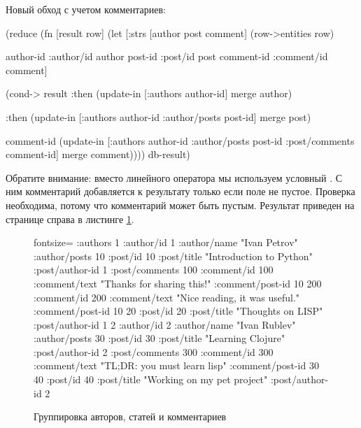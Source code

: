 Новый обход с учетом комментариев:

\begin{english}
  \begin{clojure}
(reduce
 (fn [result row]
   (let [{:strs [author post comment]}
         (row->entities row)

         {author-id :author/id}   author
         {post-id :post/id}       post
         {comment-id :comment/id} comment]

     (cond-> result
       :then
       (update-in [:authors
                   author-id] merge author)

       :then
       (update-in [:authors
                   author-id
                   :author/posts
                   post-id] merge post)

       comment-id
       (update-in [:authors
                   author-id
                   :author/posts
                   post-id
                   :post/comments
                   comment-id] merge comment))))
 {}
 db-result)
  \end{clojure}
\end{english}

Обратите внимание: вместо линейного оператора \code{\arr} мы используем условный . С ним комментарий добавляется к результату только если поле  не пустое. Проверка необходима, потому что комментарий может быть пустым. Результат приведен на странице справа в листинге \ref{lis:nested-result}.

\begin{figure}[ht!]

\begin{english}
  \begin{clojure*}{fontsize=\small}
{:authors
 {1 {:author/id 1
     :author/name "Ivan Petrov"
     :author/posts
       {10 {:post/id 10
            :post/title "Introduction to Python"
            :post/author-id 1
            :post/comments
              {100 {:comment/id 100
                    :comment/text "Thanks for sharing this!"
                    :comment/post-id 10}
               200 {:comment/id 200
                    :comment/text "Nice reading, it was useful."
                    :comment/post-id 10}}}
        20 {:post/id 20
            :post/title "Thoughts on LISP"
            :post/author-id 1}}}
  2 {:author/id 2
     :author/name "Ivan Rublev"
     :author/posts
       {30 {:post/id 30
            :post/title "Learning Clojure"
            :post/author-id 2
            :post/comments
              {300 {:comment/id 300
                    :comment/text "TL;DR: you must learn lisp"
                    :comment/post-id 30}}}
        40 {:post/id 40
            :post/title "Working on my pet project"
            :post/author-id 2}}}}}
  \end{clojure*}
\end{english}


\caption{Группировка авторов, статей и комментариев}
\label{lis:nested-result}

\end{figure}

